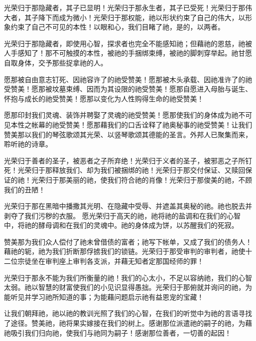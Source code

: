 光荣归于那隐藏者，其子已显明！光荣归于那永生者，其子已受死！光荣归于那伟大者，其子降下而成为微小！光荣归于那权能，祂以形状约束了自己的伟大，以形象约束了自己不可见的本性！以眼和心，我们目睹了祂，是的，以两者。\par

光荣归于那隐藏者，即使用心智，探求者也完全不能感知祂；但藉祂的恩慈，祂被人手感知了！那不可触摸的本性，被祂的手捆绑束缚，被祂的脚刺穿举起。祂甘愿自取身体，交予那些捉拿祂的人。\par

愿那被自由意志钉死、因祂容许了的祂受赞美！愿那被木头承载、因祂准许了的祂受赞美！愿那被坟墓束缚、因而为其设限的祂受赞美！愿那自愿进入母胎与诞生、怀抱与成长的祂受赞美！愿那以变化为人性购得生命的祂受赞美！\par

愿那印封我们灵魂、装饰并聘娶了灵魂的祂受赞美！愿那使我们的身体成为祂不可见本性之帐幕的祂受赞美！愿那藉我们的口舌诠释了祂奥秘事的祂受赞美！让我们赞美那以我们的琴弦歌颂其光荣、以竖琴歌颂其德能的圣言。外邦人已聚集而来，聆听祂的诗章。\par

光荣归于善者的圣子，被恶者之子所弃绝！光荣归于义者的圣子，被邪恶之子所钉死！光荣归于那释放我们、却为我们被捆绑的祂！光荣归于那交付保证、又赎回保证的祂！光荣归于那美丽的祂，使我们符合祂的肖像！光荣归于那俊美的祂，不顾我们的丑陋！\par

光荣归于那在黑暗中播撒其光明、在隐藏中受辱、并遮盖其奥秘的祂。祂也脱去并剥夺了我们污秽的衣服。 愿光荣归于高天的祂，祂将祂的盐调和在我们的心智中，将祂的酵母调和在我们的灵魂中。祂的身体成为饼，以苏醒我们的死寂。\par

赞美那为我们众人偿付了祂未曾借债的富者；祂写下帐单，又成了我们的债务人！藉祂的轭，祂为我们折断那俘掳我们的锁链。光荣归于那受审判的审判者，祂使十二位宗徒坐在审判座上审判各支派，并藉无知者定那国经师的罪！\par

光荣归于那永不能为我们所衡量的祂！我们的心太小，不足以容纳祂，我们的心智太弱。祂以智慧的财富使我们的小见识显得愚拙。光荣归于那俯就并询问的祂，为能听见并学习祂所知道的事；为能藉问题启示祂有益恩宠的宝藏！\par

让我们朝拜祂，祂以祂的教训光照了我们的心智，在我们的听觉中为祂的言语寻找了途径。赞美祂，祂将果实嫁接在我们的树上。感谢那位派遣祂的嗣子的祂，为藉祂吸引我们归向祂，使我们与祂同为嗣子！感谢那位善者，一切善的起因！\par

